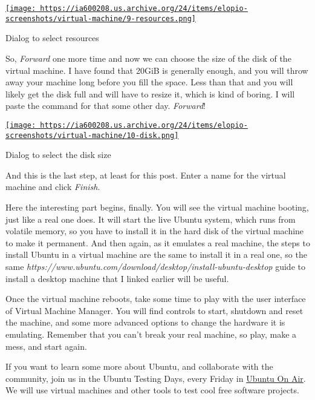 \documentclass[12pt]{article}
\begin{document}
\begin{center}
  \href{
    https://ia600208.us.archive.org/24/items/elopio-screenshots/virtual-machine/9-resources.png}{
    \texttt{[image: 
    https://ia600208.us.archive.org/24/items/elopio-screenshots/virtual-machine/9-resources.png]}
  }
  \caption{Dialog to select resources}
\end{center}

So, \emph{Forward} one more time and now we can choose the size of the disk of
the virtual machine. I have found that 20GiB is generally enough, and you will
throw away your machine long before you fill the space. Less than that and you
will likely get the disk full and will have to resize it, which is kind of
boring. I will paste the command for that some other day. \emph{Forward}!

\begin{center}
  \href{
    https://ia600208.us.archive.org/24/items/elopio-screenshots/virtual-machine/10-disk.png}{
    \texttt{[image: 
    https://ia600208.us.archive.org/24/items/elopio-screenshots/virtual-machine/10-disk.png]}
  }
  \caption{Dialog to select the disk size}
\end{center}

And this is the last step, at least for this post. Enter a name for the virtual
machine and click \emph{Finish}.

Here the interesting part begins, finally. You will see the virtual machine
booting, just like a real one does. It will start the live Ubuntu system, which
runs from volatile memory, so you have to install it in the hard disk of the
virtual machine to make it permanent. And then again, as it emulates a real
machine, the steps to install Ubuntu in a virtual machine are the same to
install it in a real one, so the same
\emph{https://www.ubuntu.com/download/desktop/install-ubuntu-desktop}
     {guide to install a desktop machine} that I linked earlier will be useful.

Once the virtual machine reboots, take some time to play with the user interface
of Virtual Machine Manager. You will find controls to start, shutdown and reset
the machine, and some more advanced options to change the hardware it is
emulating. Remember that you can't break your real machine, so play, make a
mess, and start again.

If you want to learn some more about Ubuntu, and collaborate with the community,
join us in the Ubuntu Testing Days, every Friday in
\href{http://ubuntuonair.com/}{Ubuntu On Air}. We will use virtual machines and
other tools to test cool free software projects.
\end{document}
